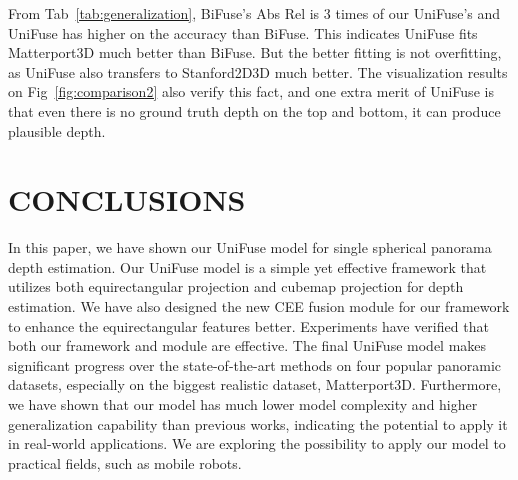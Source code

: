 \documentclass[letterpaper, 10 pt, conference]{ieeeconf}
\begin{document}
From Tab~\ref{tab:generalization}, BiFuse's Abs Rel is 3 times of our UniFuse's and UniFuse has  higher on the accuracy   than BiFuse. This indicates UniFuse fits Matterport3D much better than BiFuse. But the better fitting is not overfitting, as UniFuse also transfers to Stanford2D3D much better. 
The visualization results on Fig~\ref{fig:comparison2} also verify this fact, and one extra merit of UniFuse is that even there is no ground truth depth on the top and bottom, it can produce plausible depth. 





\begin{table}[t]
\vspace{5pt}
  \centering
\caption{\textbf{Generalization Comparison.}}
\label{tab:generalization}
\vspace{-10pt}
\end{table}


\section{CONCLUSIONS}
In this paper, we have shown our UniFuse model for single spherical panorama depth estimation. Our UniFuse model is a simple yet effective framework that utilizes both equirectangular projection and cubemap projection for  depth estimation. We have also designed the new CEE fusion module for our framework to enhance the equirectangular features better. 
Experiments have verified that both our framework and module are effective. The final UniFuse model makes significant progress over the state-of-the-art methods on four popular  panoramic datasets, especially on the biggest realistic dataset, Matterport3D. 
Furthermore, we have shown that our model has much lower model complexity and higher generalization capability than previous works, indicating the potential to apply it in real-world applications.
We are exploring the possibility to apply our model to practical fields, such as mobile robots. 


{\small


}
\end{document}

